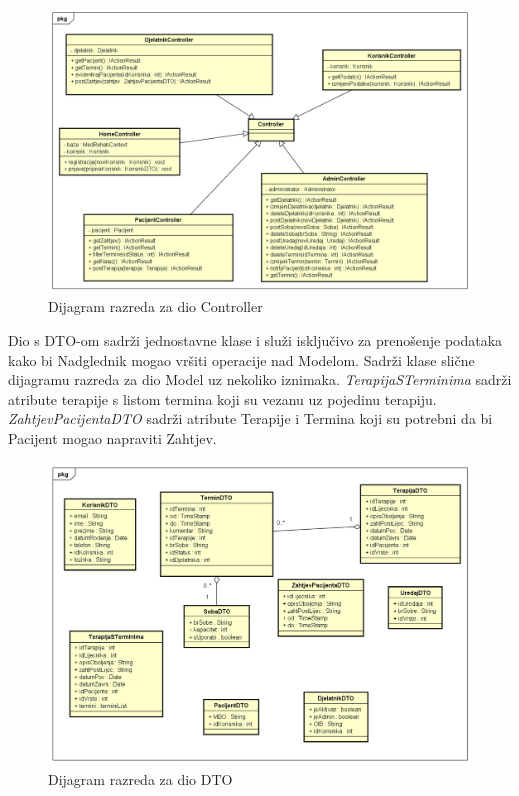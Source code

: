 			\begin{figure}[H]
				\includegraphics[scale=0.4]{slike/Dijagram_razreda_3.PNG} %
				\centering
				\caption{Dijagram razreda za dio Controller}
				\label{fig:dijagram_razreda_1}
			\end{figure}
			
			Dio s DTO-om sadrži jednostavne klase i služi isključivo za prenošenje podataka kako bi Nadglednik mogao vršiti operacije nad Modelom. Sadrži klase slične dijagramu razreda za dio Model uz nekoliko iznimaka. \textit{TerapijaSTerminima} sadrži atribute terapije s listom termina koji su vezanu uz pojedinu terapiju. \textit{ZahtjevPacijentaDTO} sadrži atribute Terapije i Termina koji su potrebni da bi Pacijent mogao napraviti Zahtjev.
			
			\begin{figure}[H]
				\includegraphics[scale=0.4]{slike/Dijagram_razreda_2.PNG} %
				\centering
				\caption{Dijagram razreda za dio DTO}
				\label{fig:dijagram_razreda_2}
			\end{figure}
			
